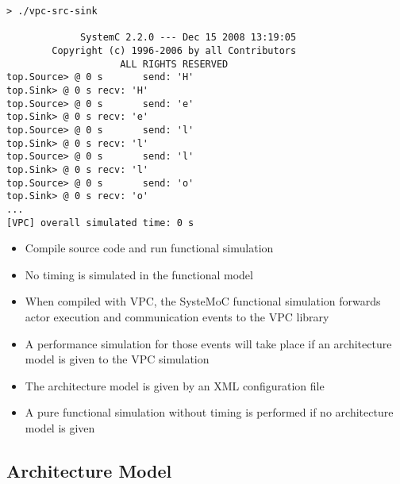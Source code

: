 \begin{frame}[fragile=singleslide]
\begin{lstlisting}
> ./vpc-src-sink

             SystemC 2.2.0 --- Dec 15 2008 13:19:05
        Copyright (c) 1996-2006 by all Contributors
                    ALL RIGHTS RESERVED            
top.Source> @ 0 s       send: 'H'
top.Sink> @ 0 s recv: 'H'
top.Source> @ 0 s       send: 'e'
top.Sink> @ 0 s recv: 'e'
top.Source> @ 0 s       send: 'l'
top.Sink> @ 0 s recv: 'l'
top.Source> @ 0 s       send: 'l'
top.Sink> @ 0 s recv: 'l'
top.Source> @ 0 s       send: 'o'
top.Sink> @ 0 s recv: 'o'
...
[VPC] overall simulated time: 0 s
\end{lstlisting}
\begin{itemize}
\item Compile source code and run functional simulation
\item No timing is simulated in the functional model
\end{itemize}
\end{frame}


\begin{frame}[fragile=singleslide]
\begin{itemize}
\item When compiled with VPC, the SysteMoC functional simulation forwards actor execution and communication events to the VPC library
\item A performance simulation for those events will take place if an architecture model is given to the VPC simulation
\item The architecture model is given by an XML configuration file
\item A pure functional simulation without timing is performed if no architecture model is given
\end{itemize}
\end{frame}


\subsection{Architecture Model}



